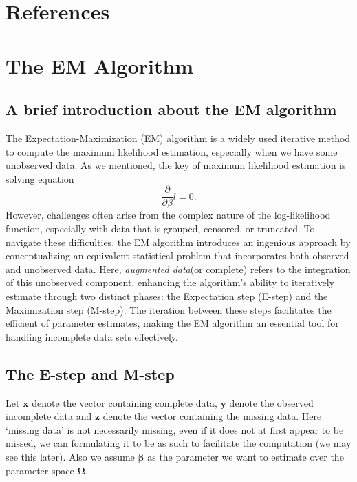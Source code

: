 \documentclass[
  a4paper,
  oneside,
  openany,
  12pt,
  onecolumn]{book}
\theoremstyle{plain}
\theoremstyle{remark}
\begin{document}
\chapter{References}\label{references}


\chapter{The EM Algorithm}\label{sec-EM}

\section{A brief introduction about the EM
algorithm}\label{a-brief-introduction-about-the-em-algorithm}

The Expectation-Maximization (EM) algorithm is a widely used iterative
method to compute the maximum likelihood estimation, especially when we
have some unobserved data\citep{Ng2012EMAlgorithm}. As we mentioned, the
key of maximum likelihood estimation is solving equation \[
\frac{\partial}{\partial \beta}l=0.
\] However, challenges often arise from the complex nature of the
log-likelihood function, especially with data that is grouped, censored,
or truncated. To navigate these difficulties, the EM algorithm
introduces an ingenious approach by conceptualizing an equivalent
statistical problem that incorporates both observed and unobserved data.
Here, \emph{augmented data}(or complete) refers to the integration of
this unobserved component, enhancing the algorithm's ability to
iteratively estimate through two distinct phases: the Expectation step
(E-step) and the Maximization step (M-step). The iteration between these
steps facilitates the efficient of parameter estimates, making the EM
algorithm an essential tool for handling incomplete data sets
effectively.

\section{The E-step and M-step}\label{the-e-step-and-m-step}

Let \(\boldsymbol{x}\) denote the vector containing complete data,
\(\boldsymbol{y}\) denote the observed incomplete data and
\(\boldsymbol{z}\) denote the vector containing the missing data. Here
`missing data' is not necessarily missing, even if it does not at first
appear to be missed, we can formulating it to be as such to facilitate
the computation (we may see this later)\citep{Ng2012EMAlgorithm}. Also
we assume \(\boldsymbol{\beta}\) as the parameter we want to estimate
over the parameter space \(\boldsymbol{\Omega}\).
\end{document}
